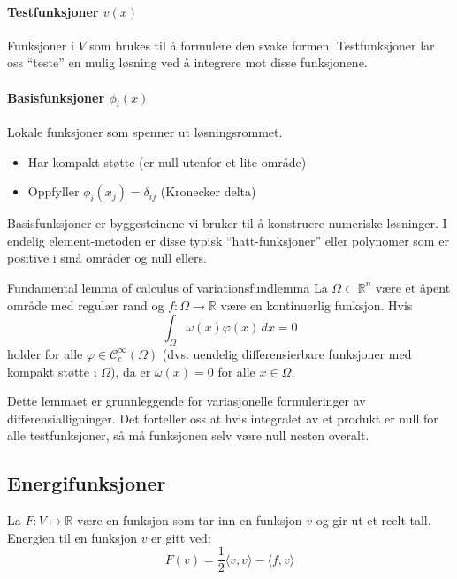\paragraph{Testfunksjoner \(v(x)\)} Funksjoner i \(V\) som brukes til å formulere den svake formen.
Testfunksjoner lar oss \enquote{teste} en mulig løsning ved å integrere mot disse funksjonene.

\paragraph{Basisfunksjoner \(\phi_i(x)\)} Lokale funksjoner som spenner ut løsningsrommet.
\begin{itemize}
	\item Har kompakt støtte (er null utenfor et lite område)
	\item Oppfyller \(\phi_i(x_j) = \delta_{ij}\) (Kronecker delta)
\end{itemize}

Basisfunksjoner er byggesteinene vi bruker til å konstruere numeriske løsninger. I endelig element-metoden er disse typisk \enquote{hatt-funksjoner} eller polynomer som er positive i små områder og null ellers.

\begin{lemma}{Fundamental lemma of calculus of variations}{fundlemma}
	La $\Omega \subset \mathbb{R}^n$ være et åpent område med regulær rand og $f: \Omega \rightarrow \mathbb{R}$ være en kontinuerlig funksjon.
	Hvis
	\begin{equation}
		\int_{\Omega} \omega(x) \varphi(x) \, dx = 0
	\end{equation}
	holder for alle $\varphi \in \mathcal{C}_c^{\infty}(\Omega)$ (dvs. uendelig differensierbare funksjoner med kompakt støtte i $\Omega$), da er $\omega(x) = 0$ for alle $x \in \Omega$.
\end{lemma}

Dette lemmaet er grunnleggende for variasjonelle formuleringer av differensialligninger. Det forteller oss at hvis integralet av et produkt er null for alle testfunksjoner, så må funksjonen selv være null nesten overalt.

\subsection{Energifunksjoner}
La \(F: V \mapsto \mathbb{R}\) være en funksjon som tar inn en funksjon \(v\) og gir ut et reelt tall. Energien til en funksjon \(v\) er gitt ved:
\[
	F(v) = \frac{1}{2} \langle v, v \rangle - \langle f, v \rangle
\]

